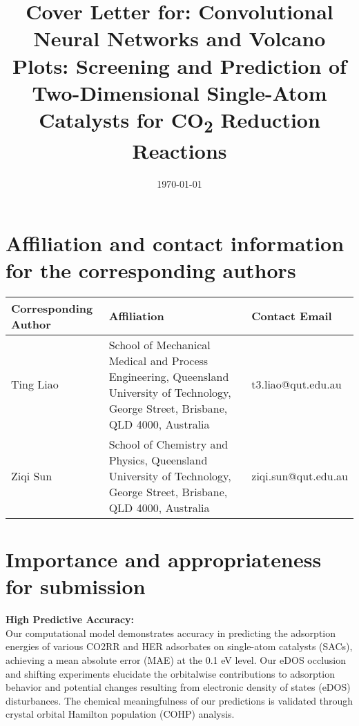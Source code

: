\documentclass[a4paper, 12pt]{article}
\begin{document}
\title{Cover Letter for: Convolutional Neural Networks and Volcano Plots:
    Screening and Prediction of Two-Dimensional Single-Atom Catalysts
    for CO\textsubscript{2} Reduction Reactions}

\date{\today}
\maketitle
\newpage


\section{Affiliation and contact information for the corresponding authors}

\begin{table}[htbp]
\label{cov_let_table:corr_author_contact}
    \begin{tabularx}{\textwidth}{p{2.5cm}p{6cm}l}
    \toprule
    Corresponding Author  & Affiliation                                             & Contact Email       \\
    \midrule
    Ting Liao             & School of Mechanical Medical and Process Engineering,
                            Queensland University of Technology, George Street,
                            Brisbane, QLD 4000, Australia                           & t3.liao@qut.edu.au   \\
    Ziqi Sun              & School of Chemistry and Physics,
                            Queensland University of Technology, George Street,
                            Brisbane, QLD 4000, Australia                           & ziqi.sun@qut.edu.au  \\
    \bottomrule
    \end{tabularx}
\end{table}


\section{Importance and appropriateness for submission}

\noindent \textbf{High Predictive Accuracy:} \\
    Our computational model demonstrates accuracy in predicting the adsorption energies
    of various CO2RR and HER adsorbates on single-atom catalysts (SACs),
    achieving a mean absolute error (MAE) at the 0.1 eV level.
    Our eDOS occlusion and shifting experiments elucidate the orbitalwise contributions
    to adsorption behavior and potential changes resulting from
    electronic density of states (eDOS) disturbances.
    The chemical meaningfulness of our predictions is validated through
    crystal orbital Hamilton population (COHP) analysis. \\
\end{document}
